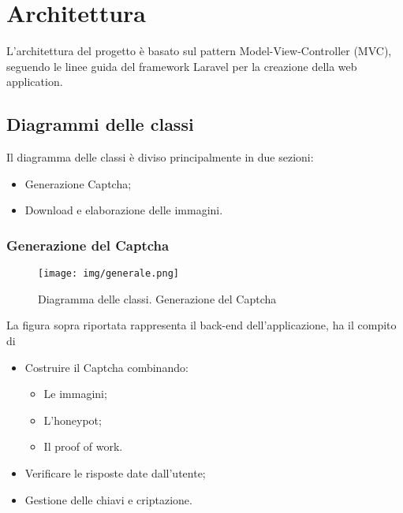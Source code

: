 \section{Architettura}
L'architettura del progetto è basato sul pattern Model-View-Controller (MVC), seguendo le linee guida del framework Laravel per la creazione della web application.


\subsection{Diagrammi delle classi}

Il diagramma delle classi è diviso principalmente in due sezioni:
\begin{itemize}
    \item Generazione Captcha;
    \item Download e elaborazione delle immagini.
\end{itemize}

\subsubsection{Generazione del Captcha}

\begin{landscape}
\begin{figure}[H]
    \centering
    \texttt{[image: img/generale.png]}\\
    \caption{Diagramma delle classi. Generazione del Captcha}
\end{figure}
\end{landscape}
\newpage

La figura sopra riportata rappresenta il back-end dell'applicazione, ha il compito di
\begin{itemize}
    \item Costruire il Captcha combinando:
    \begin{itemize}
        \item Le immagini;
        \item L'honeypot;
        \item Il proof of work.
    \end{itemize}
    \item Verificare le risposte date dall'utente;
    \item Gestione delle chiavi e criptazione.
\end{itemize}


